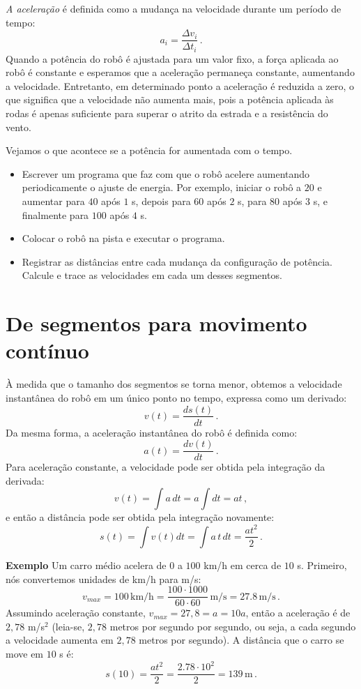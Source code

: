 {\emph{A aceleração} é definida como a mudança na velocidade durante um período de tempo:
\[a_i = \frac{\Delta v_i}{\Delta t_i}\,.\]
Quando a potência do robô é ajustada para um valor fixo, a força aplicada ao robô é constante e esperamos que a aceleração permaneça constante, aumentando a velocidade. Entretanto, em determinado ponto a aceleração é reduzida a zero, o que significa que a velocidade não aumenta mais, pois a potência aplicada às rodas é apenas suficiente para superar o atrito da estrada e a resistência do vento.

Vejamos o que acontece se a potência for aumentada com o tempo.

\begin{framed}
\begin{itemize}
\item Escrever um programa que faz com que o robô acelere aumentando periodicamente o ajuste de energia. Por exemplo, iniciar o robô a $20$ e aumentar para $40$ após $1$ s, depois para $60$ após $2$ s, para $80$ após $3$ s, e finalmente para $100$ após $4$ s.
\item Colocar o robô na pista e executar o programa.
\item Registrar as distâncias entre cada mudança da configuração de potência. Calcule e trace as velocidades em cada um desses segmentos.
\end{itemize}
\end{framed}

\section{De segmentos para movimento contínuo}\label{s.continuous}

À medida que o tamanho dos segmentos se torna menor, obtemos a velocidade instantânea do robô em um único ponto no tempo, expressa como um derivado:
\[v(t) = \frac{ds(t)}{dt}\,.\]
Da mesma forma, a aceleração instantânea do robô é definida como:
\[a(t) = \frac{dv(t)}{dt}\,.\]
Para aceleração constante, a velocidade pode ser obtida pela integração da derivada:
\[v(t) = \int a\, dt = a\int {dt} = at\,,\]
e então a distância pode ser obtida pela integração novamente:
\[s(t) = \int v(t) dt=\int a\,t\,dt = \frac{at^2}{2}\,.\]

\noindent{}\textbf{Exemplo} Um carro médio acelera de $0$ a $100$ km/h em cerca de $10$ s. Primeiro, nós convertemos unidades de km/h para m/s:
\[
v_{\textit{max}} = 100\, \textrm{km/h} = \frac{100\cdot 1000}{60\cdot 60} \,\textrm{m/s} = 27.8 \,\textrm{m/s}\,.
\]
Assumindo aceleração constante, $v_{\textit{max}} = 27,8 = a = 10a$, então a aceleração é de $2,78$ m/s$^{2}$ (leia-se, $2,78$ metros por segundo por segundo, ou seja, a cada segundo a velocidade aumenta em $2,78$ metros por segundo). A distância que o carro se move em $10$ s é:
\[s(10) = \frac{at^2}{2} = \frac{2.78\cdot 10^2}{2}= 139 \,\textrm{m}\,.\]

}
